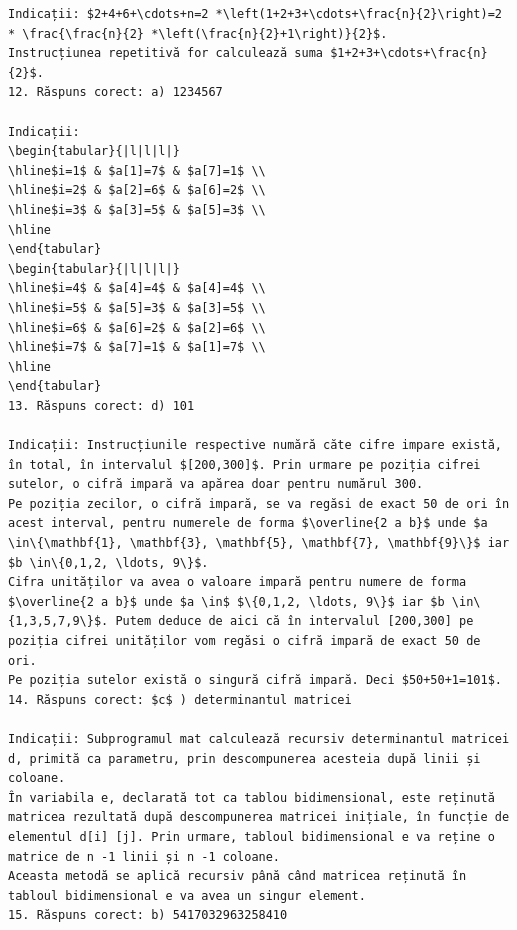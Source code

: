 \documentclass[10pt]{article}
\begin{document}
\begin{verbatim}
Indicații: $2+4+6+\cdots+n=2 *\left(1+2+3+\cdots+\frac{n}{2}\right)=2 * \frac{\frac{n}{2} *\left(\frac{n}{2}+1\right)}{2}$.
Instrucțiunea repetitivă for calculează suma $1+2+3+\cdots+\frac{n}{2}$.
12. Răspuns corect: a) 1234567

Indicații:
\begin{tabular}{|l|l|l|}
\hline$i=1$ & $a[1]=7$ & $a[7]=1$ \\
\hline$i=2$ & $a[2]=6$ & $a[6]=2$ \\
\hline$i=3$ & $a[3]=5$ & $a[5]=3$ \\
\hline
\end{tabular}
\begin{tabular}{|l|l|l|}
\hline$i=4$ & $a[4]=4$ & $a[4]=4$ \\
\hline$i=5$ & $a[5]=3$ & $a[3]=5$ \\
\hline$i=6$ & $a[6]=2$ & $a[2]=6$ \\
\hline$i=7$ & $a[7]=1$ & $a[1]=7$ \\
\hline
\end{tabular}
13. Răspuns corect: d) 101

Indicații: Instrucțiunile respective numără căte cifre impare există, în total, în intervalul $[200,300]$. Prin urmare pe poziția cifrei sutelor, o cifră impară va apărea doar pentru numărul 300.
Pe poziția zecilor, o cifră impară, se va regăsi de exact 50 de ori în acest interval, pentru numerele de forma $\overline{2 a b}$ unde $a \in\{\mathbf{1}, \mathbf{3}, \mathbf{5}, \mathbf{7}, \mathbf{9}\}$ iar $b \in\{0,1,2, \ldots, 9\}$.
Cifra unităților va avea o valoare impară pentru numere de forma $\overline{2 a b}$ unde $a \in$ $\{0,1,2, \ldots, 9\}$ iar $b \in\{1,3,5,7,9\}$. Putem deduce de aici că în intervalul [200,300] pe poziția cifrei unităților vom regăsi o cifră impară de exact 50 de ori.
Pe poziția sutelor există o singură cifră impară. Deci $50+50+1=101$.
14. Răspuns corect: $c$ ) determinantul matricei

Indicații: Subprogramul mat calculează recursiv determinantul matricei d, primită ca parametru, prin descompunerea acesteia după linii și coloane.
În variabila e, declarată tot ca tablou bidimensional, este reținută matricea rezultată după descompunerea matricei inițiale, în funcție de elementul d[i] [j]. Prin urmare, tabloul bidimensional e va reține o matrice de n -1 linii și n -1 coloane.
Aceasta metodă se aplică recursiv până când matricea reținută în tabloul bidimensional e va avea un singur element.
15. Răspuns corect: b) 5417032963258410


\end{verbatim}
\end{document}
